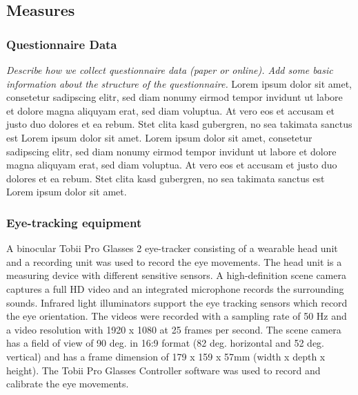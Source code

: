 \documentclass[
  english,
  man,floatsintext]{apa6}
\begin{document}
\hypertarget{measures}{%
\subsection{Measures}\label{measures}}

\hypertarget{questionnaire-data}{%
\subsubsection{Questionnaire Data}\label{questionnaire-data}}

\emph{Describe how we collect questionnaire data (paper or online). Add some basic information about the structure of the questionnaire.} Lorem ipsum dolor sit amet, consetetur sadipscing elitr, sed diam nonumy eirmod tempor invidunt ut labore et dolore magna aliquyam erat, sed diam voluptua. At vero eos et accusam et justo duo dolores et ea rebum. Stet clita kasd gubergren, no sea takimata sanctus est Lorem ipsum dolor sit amet. Lorem ipsum dolor sit amet, consetetur sadipscing elitr, sed diam nonumy eirmod tempor invidunt ut labore et dolore magna aliquyam erat, sed diam voluptua. At vero eos et accusam et justo duo dolores et ea rebum. Stet clita kasd gubergren, no sea takimata sanctus est Lorem ipsum dolor sit amet.

\hypertarget{eye-tracking-equipment}{%
\subsubsection{Eye-tracking equipment}\label{eye-tracking-equipment}}

A binocular Tobii Pro Glasses 2 eye-tracker consisting of a wearable head unit and a recording unit was used to record the eye movements. The head unit is a measuring device with different sensitive sensors. A high-definition scene camera captures a full HD video and an integrated microphone records the surrounding sounds. Infrared light illuminators support the eye tracking sensors which record the eye orientation. The videos were recorded with a sampling rate of 50 Hz and a video resolution with 1920 x 1080 at 25 frames per second. The scene camera has a field of view of 90 deg. in 16:9 format (82 deg. horizontal and 52 deg. vertical) and has a frame dimension of 179 x 159 x 57mm (width x depth x height). The Tobii Pro Glasses Controller software was used to record and calibrate the eye movements.
\end{document}
